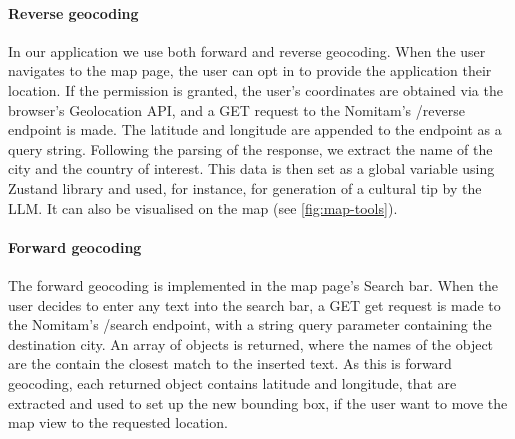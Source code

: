 \paragraph{Reverse geocoding}
In our application we use both forward and reverse geocoding. When the user navigates to the map page, the user can opt in to provide the application their location. If the permission is granted, the user’s coordinates are obtained via the browser’s Geolocation API, and a GET request to the Nomitam's /reverse endpoint is made. The latitude and longitude are appended to the endpoint as a query string. Following the parsing of the response, we extract the name of the city and the country of interest. This data is then set as a global variable using Zustand library and used, for instance, for generation of a cultural tip by the LLM. It can also be visualised on the map (see \autoref{fig:map-tools}).

\paragraph{Forward geocoding}
The forward geocoding is implemented in the map page's Search bar. When the user decides to enter any text into the search bar, a GET get request is made to the Nomitam's /search endpoint, with a string query parameter containing the destination city. An array of objects is returned, where the names of the object are the contain the closest match to the inserted text. As this is forward geocoding, each returned object contains latitude and longitude, that are extracted and used to set up the new bounding box, if the user want to move the map view to the requested location.

